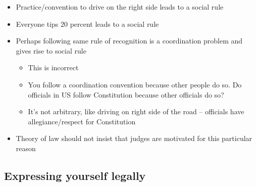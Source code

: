 \begin{itemize}
  \begin{itemize}
  \tightlist
  \item
    Practice/convention to drive on the right side leads to a social
    rule
  \item
    Everyone tips 20 percent leads to a social rule
  \item
    Perhaps following same rule of recognition is a coordination problem
    and gives rise to social rule

    \begin{itemize}
    \tightlist
    \item
      This is incorrect
    \item
      You follow a coordination convention because other people do so.
      Do officials in US follow Constitution because other officials do
      so?
    \item
      It's not arbitrary, like driving on right side of the road --
      officials have allegiance/respect for Constitution
    \end{itemize}
  \item
    Theory of law should not insist that judges are motivated for this
    particular reason
  \end{itemize}
\end{itemize}

\hypertarget{expressing-yourself-legally}{%
\subsection{Expressing yourself
legally}\label{expressing-yourself-legally}}


